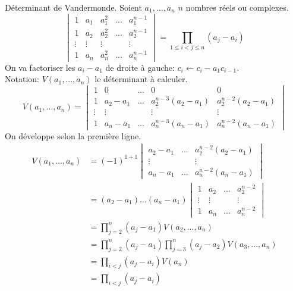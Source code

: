 \documentclass[11pt]{article}
\begin{document}
\begin{thm}{Déterminant de Vandermonde.}{}
    Soient $a_1,...,a_n$ $n$ nombres réels ou complexes.
    \begin{equation*}
        \begin{vmatrix}
            1&a_1&a_1^2&...&a_1^{n-1}\\
            1&a_2&a_2^2&...&a_2^{n-1}\\
            \vdots&\vdots&\vdots&&\vdots\\
            1&a_n&a_n^2&...&a_n^{n-1}
        \end{vmatrix}
        = \prod_{1\leq i < j \leq n}(a_j-a_i)
    \end{equation*}
    \tcblower
    On va factoriser les $a_i-a_1$ de droite à gauche: $c_i \gets c_i - a_1 c_{i-1}$.\\
    Notation: $V(a_1,...,a_n)$ le déterminant à calculer.
    \begin{equation*}
        V(a_1,...,a_n)=\begin{vmatrix}
            1&0&\dots&0&0\\
            1&a_2-a_1&\dots&a_2^{n-3}(a_2-a_1)&a_2^{n-2}(a_2-a_1)\\
            \vdots&\vdots&&\vdots&\vdots\\
            1&a_n-a_1&\dots&a_n^{n-3}(a_n-a_1)&a_n^{n-2}(a_n-a_1)
        \end{vmatrix}
    \end{equation*}
    On développe selon la première ligne.
    \begin{align*}
        V(a_1,...,a_n)&=(-1)^{1+1}\begin{vmatrix}
            a_2-a_1&...&a_2^{n-2}(a_2-a_1)\\
            \vdots&&\vdots\\
            a_n-a_1&...&a_n^{n-2}(a_n-a_1)
        \end{vmatrix}\\
        &=(a_2-a_1)...(a_n-a_1)\begin{vmatrix}
            1&a_2&...&a_2^{n-2}\\
            \vdots&\vdots&&\vdots\\
            1&a_n&...&a_n^{n-2}
        \end{vmatrix}\\
        &=\prod_{j=2}^n(a_j-a_1)V(a_2,...,a_n)\\
        &=\prod_{j=2}^n(a_j-a_1)\prod_{j=3}^n(a_j-a_2)V(a_3,...,a_n)\\
        &=\prod_{i<j}(a_j-a_i)V(a_n)\\
        &=\prod_{i<j}(a_j-a_i)
    \end{align*}
\end{thm}
\end{document}
